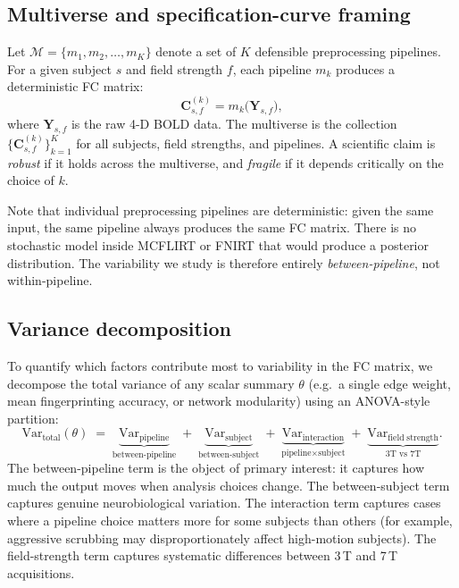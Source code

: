\documentclass[11pt,a4paper]{article}
\begin{document}
\subsection{Multiverse and specification-curve framing}

Let $\mathcal{M} = \{m_1, m_2, \ldots, m_K\}$ denote a set of $K$ defensible preprocessing pipelines. For a given subject $s$ and field strength $f$, each pipeline $m_k$ produces a deterministic FC matrix:
%
\begin{equation}
    \mathbf{C}_{s,f}^{(k)} = m_k\!\bigl(\mathbf{Y}_{s,f}\bigr),
\end{equation}
%
where $\mathbf{Y}_{s,f}$ is the raw 4-D BOLD data. The multiverse is the collection $\{\mathbf{C}_{s,f}^{(k)}\}_{k=1}^{K}$ for all subjects, field strengths, and pipelines. A scientific claim is \emph{robust} if it holds across the multiverse, and \emph{fragile} if it depends critically on the choice of $k$.

Note that individual preprocessing pipelines are deterministic: given the same input, the same pipeline always produces the same FC matrix. There is no stochastic model inside MCFLIRT or FNIRT that would produce a posterior distribution. The variability we study is therefore entirely \emph{between-pipeline}, not within-pipeline.

\subsection{Variance decomposition}

To quantify which factors contribute most to variability in the FC matrix, we decompose the total variance of any scalar summary $\theta$ (e.g.\ a single edge weight, mean fingerprinting accuracy, or network modularity) using an ANOVA-style partition:
%
\begin{equation}\label{eq:anova}
    \mathrm{Var}_{\mathrm{total}}(\theta) \;=\; \underbrace{\mathrm{Var}_{\mathrm{pipeline}}}_{\text{between-pipeline}} \;+\; \underbrace{\mathrm{Var}_{\mathrm{subject}}}_{\text{between-subject}} \;+\; \underbrace{\mathrm{Var}_{\mathrm{interaction}}}_{\text{pipeline} \times \text{subject}} \;+\; \underbrace{\mathrm{Var}_{\mathrm{field\;strength}}}_{\text{3T vs 7T}}.
\end{equation}
%
The between-pipeline term is the object of primary interest: it captures how much the output moves when analysis choices change. The between-subject term captures genuine neurobiological variation. The interaction term captures cases where a pipeline choice matters more for some subjects than others (for example, aggressive scrubbing may disproportionately affect high-motion subjects). The field-strength term captures systematic differences between 3\,T and 7\,T acquisitions.
\end{document}
